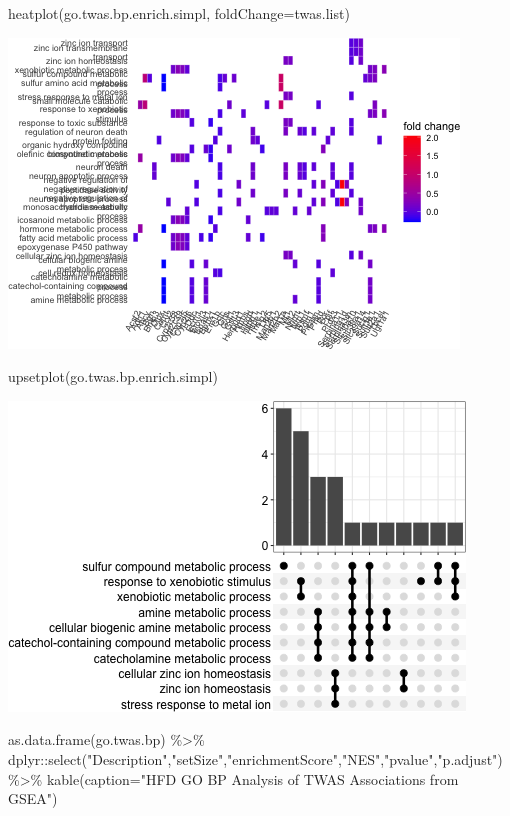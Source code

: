 \documentclass[
]{article}
\newenvironment{Shaded}{\begin{snugshade}}{\end{snugshade}}
\newcommand{\AttributeTok}[1]{\textcolor[rgb]{0.77,0.63,0.00}{#1}}
\newcommand{\FunctionTok}[1]{\textcolor[rgb]{0.00,0.00,0.00}{#1}}
\newcommand{\NormalTok}[1]{#1}
\newcommand{\SpecialCharTok}[1]{\textcolor[rgb]{0.00,0.00,0.00}{#1}}
\newcommand{\StringTok}[1]{\textcolor[rgb]{0.31,0.60,0.02}{#1}}
\begin{document}
\begin{Shaded}
\begin{Highlighting}[]
\FunctionTok{heatplot}\NormalTok{(go.twas.bp.enrich.simpl, }\AttributeTok{foldChange=}\NormalTok{twas.list)}
\end{Highlighting}
\end{Shaded}

\includegraphics{figures/twas-go-hfd-8.png}

\begin{Shaded}
\begin{Highlighting}[]
\FunctionTok{upsetplot}\NormalTok{(go.twas.bp.enrich.simpl)}
\end{Highlighting}
\end{Shaded}

\includegraphics{figures/twas-go-hfd-9.png}

\begin{Shaded}
\begin{Highlighting}[]
\FunctionTok{as.data.frame}\NormalTok{(go.twas.bp) }\SpecialCharTok{\%\textgreater{}\%}\NormalTok{ dplyr}\SpecialCharTok{::}\FunctionTok{select}\NormalTok{(}\StringTok{"Description"}\NormalTok{,}\StringTok{"setSize"}\NormalTok{,}\StringTok{"enrichmentScore"}\NormalTok{,}\StringTok{"NES"}\NormalTok{,}\StringTok{"pvalue"}\NormalTok{,}\StringTok{"p.adjust"}\NormalTok{) }\SpecialCharTok{\%\textgreater{}\%}
  \FunctionTok{kable}\NormalTok{(}\AttributeTok{caption=}\StringTok{"HFD GO BP Analysis of TWAS Associations from GSEA"}\NormalTok{)}
\end{Highlighting}
\end{Shaded}
\end{document}
